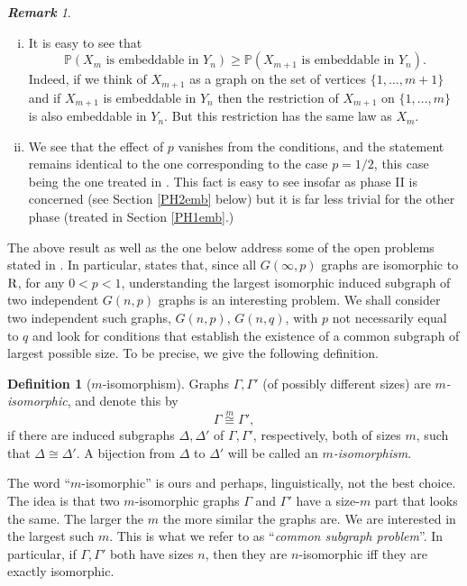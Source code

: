 \documentclass[reqno]{amsart}
\theoremstyle{theorem}
\theoremstyle{definition}
\newtheorem{definition}[theorem]{Definition}
\theoremstyle{remark}
\newtheorem{remark}[theorem]{\bf\em Remark}
\def\P{\mathbb{P}}
\newcommand{\1}{{\text{\Large $\mathfrak 1$}}}	%
\numberwithin{equation}{section}
\newcommand{\jso}[1]{\stackrel{#1}{\cong}}
\def\Rado{\text{\textsf{\textbf{R}}}}
\begin{document}
\begin{remark}
\begin{enumerate}[(i)]
but not exactly, complementary. In fact, when 
both conditions are violated, 
several things can happen, depending on the
precise choice of the integer sequence $m(n)$.
For example, if $n_k = 2^k$ and $m_k=2k+1$ then
the behavior of graph embedding is a very delicate question.
\item 
It is easy to see that 
\[
\P(X_m \text{ is embeddable in } Y_n)
\ge \P(X_{m+1} \text{ is embeddable in } Y_n).
\]
Indeed, if we think of $X_{m+1}$ as a graph on the set of vertices
$\{1,\ldots,m+1\}$ and if $X_{m+1}$ is embeddable in $Y_n$ then
the restriction of $X_{m+1}$ on $\{1,\ldots,m\}$ is
also embeddable in $Y_n$. But this restriction has the same
law as $X_m$.
\item
We see that the effect of $p$ vanishes from
the conditions, and the statement remains identical
to the one corresponding to the case $p=1/2$, this case being the one 
treated in \cite{ChD23}. %
This fact is easy to see insofar as phase II is concerned 
(see Section \ref{PH2emb} below) but it is far less
trivial for the other phase (treated in Section \ref{PH1emb}.)
\end{enumerate}
\end{remark}

The above result as well as the one below address some of the
open problems stated in \cite{ChD23}. In particular, \cite{ChD23} states
that, since all $G(\infty, p)$ graphs are isomorphic to $\Rado$, for
any $0<p<1$, understanding the largest isomorphic induced subgraph
of two independent $G(n,p)$ graphs is an interesting problem.
We shall consider two independent such graphs, $G(n,p)$, $G(n,q)$,
with $p$ not necessarily equal to $q$ and look for conditions
that establish the existence of a common subgraph of largest possible size.
To be precise, we give the following definition.

\begin{definition}[$m$-isomorphism]
\label{misodef}
Graphs $\Gamma, \Gamma'$ (of possibly different sizes)  
are {\em $m$-isomorphic}, and denote this by
\[
\Gamma \jso{m} \Gamma',
\]
if there are 
induced subgraphs $\Delta, \Delta'$ of $\Gamma, \Gamma'$, respectively,
both of sizes $m$, such that $\Delta \cong \Delta'$.
A bijection from $\Delta$ to $\Delta'$ will be called an 
{\em $m$-isomorphism}.
\end{definition}

The word ``$m$-isomorphic'' is ours and perhaps, linguistically,
not the best choice. The idea is that two $m$-isomorphic graphs
$\Gamma$ and $\Gamma'$ have a size-$m$ part that looks the same.
The larger the $m$ the more similar the graphs are. We are interested
in the largest such $m$.
This is what we refer to as ``{\em common subgraph problem}''.
In particular, if $\Gamma,\Gamma'$ both have sizes $n$, then they
are $n$-isomorphic iff they are exactly isomorphic.
\end{document}
